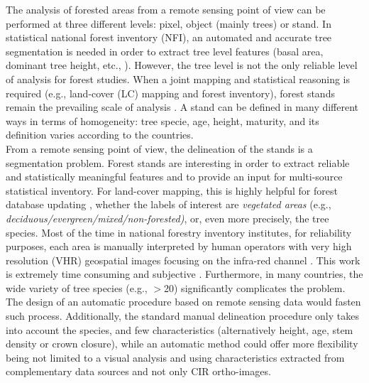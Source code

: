 The analysis of forested areas from a remote sensing point of view can be performed at three different levels: pixel, object (mainly trees) or stand. In statistical national forest inventory (NFI), an automated and accurate tree segmentation is needed in order to extract tree level features (basal area, dominant tree height, etc., \citep{means2000predicting,Malatamo}). However, the tree level is not the only reliable level of analysis for forest studies. When a joint mapping and statistical reasoning is required (e.g., land-cover (LC) mapping and forest inventory), forest stands remain the prevailing scale of analysis \citep{means2000predicting,White2016CJRS}. A stand can be defined in many different ways in terms of homogeneity: tree specie, age, height, maturity, and its definition varies according to the countries. \\

From a remote sensing point of view, the delineation of the stands is a segmentation problem. Forest stands are interesting in order to extract reliable and statistically meaningful features and to provide an input for multi-source statistical inventory. For land-cover mapping, this is highly helpful for forest database updating \citep{Kim09}, whether the labels of interest are \textit{vegetated areas} {(e.g., \textit{deciduous/evergreen/mixed/non-forested)}}, or, even more precisely, the tree species. Most of the time in national forestry inventory institutes, for reliability purposes, each area is manually interpreted by human operators with very high resolution (VHR) geospatial images focusing on the infra-red channel \citep{Malatamo}. This work is extremely time consuming and subjective \citep{Wulder2008}. Furthermore, in many countries, the wide variety of tree species (e.g., $>$20) significantly complicates the problem. The design of an automatic procedure based on remote sensing data would fasten such process. Additionally, the standard manual delineation procedure only takes into account the species, and few characteristics (alternatively height, age, stem density or crown closure), while an automatic method could offer more flexibility being not limited to a visual analysis and using characteristics extracted from complementary data sources and not only CIR ortho-images. \\

